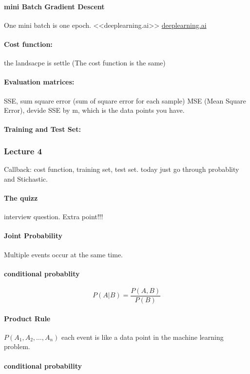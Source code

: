 \documentclass[a4paper]{article}
\begin{document}
\paragraph{mini Batch Gradient Descent}
One mini batch is one epoch. <<deeplearning.ai>> \url{deeplearning.ai} 

\paragraph{Cost function:}
the landsacpe is settle (The cost function is the same)
\paragraph{Evaluation matrices:}
SSE, sum square error (sum of square error for each sample)
MSE (Mean Square Error), devide SSE by m, which is the data points you have. 
\paragraph{Training and Test Set:}

\subsubsection{Lecture 4}
Callback: cost function, training set, test set.
\newline
today just go through probablity and Stichastic.
\paragraph{The quizz} interview question.
Extra point!!!
\paragraph{Joint Probability}
Multiple events occur at the same time.
\paragraph{conditional probablity}
\begin{equation}
	P(A|B)=\frac{P(A,B)}{P(B)}
\end{equation}
\paragraph{Product Rule}
$P(A_{1},A_{2}, \dots, A_{n})$ each event is like a data point in the machine learning problem.
\paragraph{conditional probability}
\end{document}
